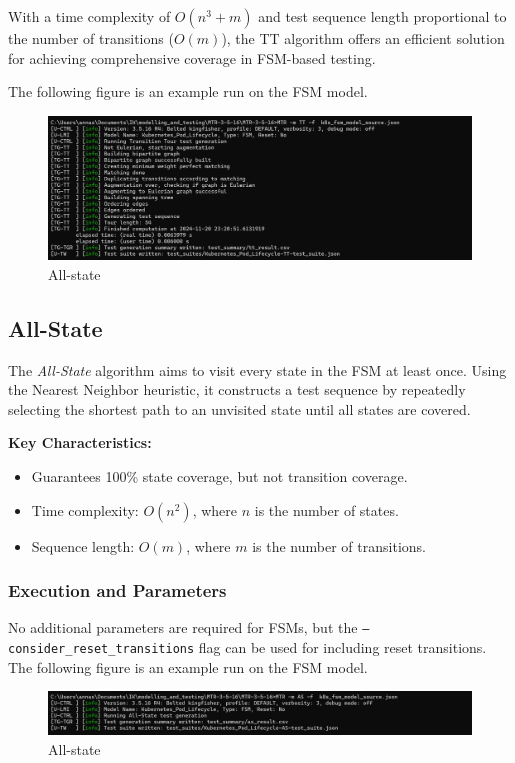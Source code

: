 \documentclass[main.tex]{subfiles}
\begin{document}
With a time complexity of $O(n^3 + m)$ and test sequence length proportional to the number of transitions ($O(m)$), the TT algorithm offers an efficient solution for achieving comprehensive coverage in FSM-based testing.

The following figure is an example run on the FSM model.
\begin{figure}[H]
    \centering
    \includegraphics[width=\textwidth]{test_results/TT.png}
    \caption{All-state}
    \label{fig:all_state}
\end{figure}

\subsection{All-State}
The \textit{All-State} algorithm aims to visit every state in the FSM at least once. Using the Nearest Neighbor heuristic, it constructs a test sequence by repeatedly selecting the shortest path to an unvisited state until all states are covered. 

\textbf{Key Characteristics:}
\begin{itemize}
    \item Guarantees 100\% state coverage, but not transition coverage.
    \item Time complexity: $O(n^2)$, where $n$ is the number of states.
    \item Sequence length: $O(m)$, where $m$ is the number of transitions.
\end{itemize}

\subsubsection{Execution and Parameters}
No additional parameters are required for FSMs, but the \texttt{--consider\_reset\_transitions} flag can be used for including reset transitions.
The following figure is an example run on the FSM model.
\begin{figure}[H]
    \centering
    \includegraphics[width=\textwidth]{test_results/AS.png}
    \caption{All-state}
    \label{fig:all_state}
\end{figure}
\end{document}
